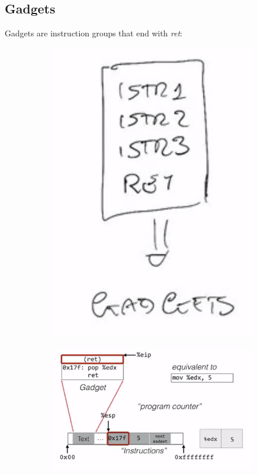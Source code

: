 \documentclass[11pt, oneside]{article}   	%
\begin{document}
\subsection*{Gadgets}
Gadgets are instruction groups that end with \emph{ret}:
\begin{figure}[H]
\begin{center}
\begin{subfigure}[H]{0.2\linewidth}
\includegraphics[width=\linewidth]{gadget}
\end{subfigure}
\begin{subfigure}[H]{0.5\linewidth}
\includegraphics[width=\linewidth]{gadex}
\end{subfigure}%
\end{center}
\end{figure}
\end{document}
